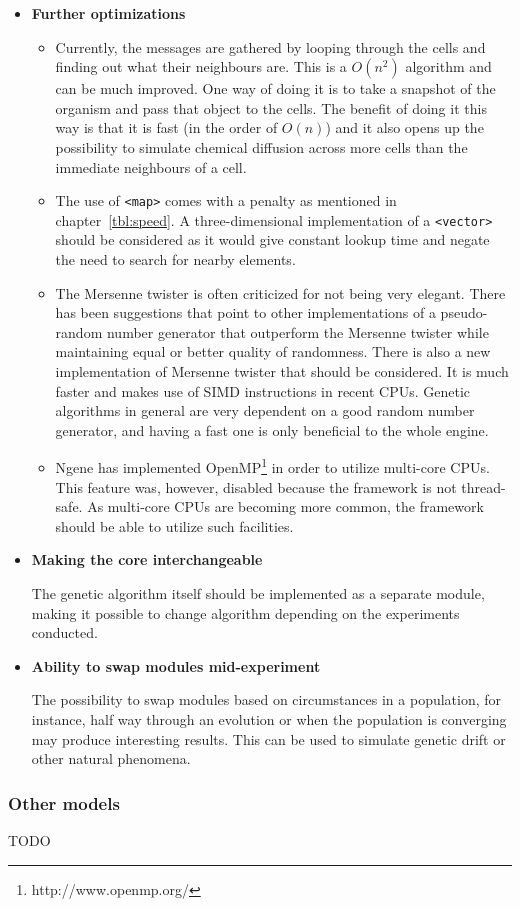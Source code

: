 \begin{itemize}
	\item\textbf{Further optimizations}
		\begin{itemize}
			\item Currently, the messages are gathered by looping through the cells and finding out what their neighbours are. This is a $O(n^{2})$ algorithm and can be much improved. One way of doing it is to take a snapshot of the organism and pass that object to the cells. The benefit of doing it this way is that it is fast (in the order of $O(n)$) and it also opens up the possibility to simulate chemical diffusion across more cells than the immediate neighbours of a cell.

			\item The use of \texttt{<map>} comes with a penalty as mentioned in chapter~\ref{tbl:speed}. A three-dimensional implementation of a \texttt{<vector>} should be considered as it would give constant lookup time and negate the need to search for nearby elements.

			\item The Mersenne twister is often criticized for not being very elegant. There has been suggestions that point to other implementations of a pseudo-random number generator that outperform the Mersenne twister while maintaining equal or better quality of randomness. There is also a new implementation of Mersenne twister that should be considered. It is much faster and makes use of SIMD instructions in recent CPUs. Genetic algorithms in general are very dependent on a good random number generator, and having a fast one is only beneficial to the whole engine.

			\item Ngene has implemented OpenMP\footnote{http://www.openmp.org/} in order to utilize multi-core CPUs. This feature was, however, disabled because the framework is not thread-safe. As multi-core CPUs are becoming more common, the framework should be able to utilize such facilities.
		\end{itemize}

	\item\textbf{Making the core interchangeable}

	The genetic algorithm itself should be implemented as a separate module, making it possible to change algorithm depending on the experiments conducted.

	\item\textbf{Ability to swap modules mid-experiment}

	The possibility to swap modules based on circumstances in a population, for instance, half way through an evolution or when the population is converging may produce interesting results. This can be used to simulate genetic drift or other natural phenomena.
\end{itemize}

\subsubsection{Other models}

TODO
